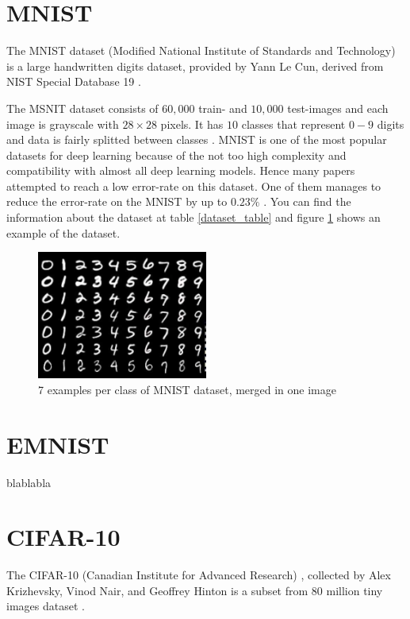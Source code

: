 \section{MNIST}
The MNIST dataset (Modified National Institute of Standards and Technology) is a large handwritten
digits dataset, provided by Yann Le Cun, derived from NIST Special Database 19 \cite{NIST}.

The MSNIT dataset consists of $60,000$ train- and $10,000$ test-images and each image is grayscale
with $28 \times 28$ pixels. It has $10$ classes that represent $0-9$ digits and data is fairly
splitted between classes \cite{MNIST_data_reference}. MNIST is one of the most popular datasets for
deep learning because of the not too high complexity and compatibility with almost all deep learning
models. Hence many papers attempted to reach a low error-rate on this dataset. One of them manages
to reduce the error-rate on the MNIST by up to $0.23\%$ \cite{MNIST_best_result_reference}. You can
find the information about the dataset at table
\ref{dataset_table} and figure \ref{fig:mnist_dataset_example} shows an example of the dataset.

\begin{figure}
  \centering
  \label{fig:mnist_dataset_example}
  \includegraphics[width=0.5\textwidth]{fig/mnist}
  \caption{7 examples per class of MNIST dataset, merged in one image \cite{MNIST_dataset_example}}
\end{figure}


\section{EMNIST}
blablabla


\section{CIFAR-10}
The CIFAR-10 (Canadian Institute for Advanced Research)
, collected by Alex Krizhevsky, Vinod Nair, and Geoffrey Hinton is a subset from 80 million tiny
images dataset \cite{CIFAR-10_origin_dataset}.

